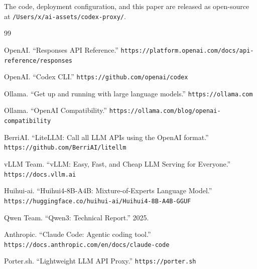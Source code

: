 \documentclass[11pt,a4paper]{article}
\begin{document}
The code, deployment configuration, and this paper are released as
open-source at \texttt{/Users/x/ai-assets/codex-proxy/}.


\begin{thebibliography}{99}

OpenAI. ``Responses API Reference.''
\texttt{https://platform.openai.com/docs/api-reference/responses}

OpenAI. ``Codex CLI.''
\texttt{https://github.com/openai/codex}

Ollama. ``Get up and running with large language models.''
\texttt{https://ollama.com}

Ollama. ``OpenAI Compatibility.''
\texttt{https://ollama.com/blog/openai-compatibility}

BerriAI. ``LiteLLM: Call all LLM APIs using the OpenAI format.''
\texttt{https://github.com/BerriAI/litellm}

vLLM Team. ``vLLM: Easy, Fast, and Cheap LLM Serving for Everyone.''
\texttt{https://docs.vllm.ai}

Huihui-ai. ``Huihui4-8B-A4B: Mixture-of-Experts Language Model.''
\texttt{https://huggingface.co/huihui-ai/Huihui4-8B-A4B-GGUF}

Qwen Team. ``Qwen3: Technical Report.'' 2025.

Anthropic. ``Claude Code: Agentic coding tool.''
\texttt{https://docs.anthropic.com/en/docs/claude-code}

Porter.sh. ``Lightweight LLM API Proxy.''
\texttt{https://porter.sh}

\end{thebibliography}
\end{document}
